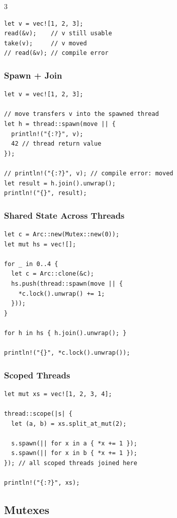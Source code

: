 \documentclass[12pt, a4paper]{article}
\begin{document}
\begin{multicols*}{3}
\begin{lstlisting}[style=rust,basicstyle=\ttfamily\scriptsize]
let v = vec![1, 2, 3];
read(&v);    // v still usable
take(v);     // v moved
// read(&v); // compile error
\end{lstlisting}
\vspace{-.5em}
\subsubsection{Spawn + Join}
\begin{lstlisting}[style=rust,basicstyle=\ttfamily\scriptsize]
let v = vec![1, 2, 3];

// move transfers v into the spawned thread
let h = thread::spawn(move || {
  println!("{:?}", v);
  42 // thread return value
});

// println!("{:?}", v); // compile error: moved
let result = h.join().unwrap();
println!("{}", result);
\end{lstlisting}
\vspace{-.5em}
\subsubsection{Shared State Across Threads}
\begin{lstlisting}[style=rust,basicstyle=\ttfamily\scriptsize]
let c = Arc::new(Mutex::new(0));
let mut hs = vec![];

for _ in 0..4 {
  let c = Arc::clone(&c);
  hs.push(thread::spawn(move || {
    *c.lock().unwrap() += 1;
  }));
}

for h in hs { h.join().unwrap(); }

println!("{}", *c.lock().unwrap());
\end{lstlisting}

\subsubsection{Scoped Threads}
\begin{lstlisting}[basicstyle=\ttfamily\scriptsize]
let mut xs = vec![1, 2, 3, 4];

thread::scope(|s| {
  let (a, b) = xs.split_at_mut(2);

  s.spawn(|| for x in a { *x += 1 });
  s.spawn(|| for x in b { *x += 1 });
}); // all scoped threads joined here

println!("{:?}", xs);
\end{lstlisting}
\vspace{-1em}
\colbreak
\subsection{Mutexes}


\end{multicols*}
\end{document}

